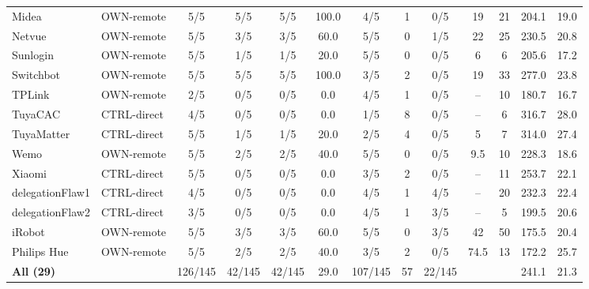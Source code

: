 \begin{table}[t]
\begin{tabular*}{\linewidth}{@{\extracolsep{\fill}} ll ccccc ccc cc @{}}
Midea & OWN-remote & 5/5 & 5/5 & 5/5 & 100.0 & 4/5 & 1 & 0/5 & 19 & 21 & 204.1 & 19.0 \\
Netvue & OWN-remote & 5/5 & 3/5 & 3/5 & 60.0 & 5/5 & 0 & 1/5 & 22 & 25 & 230.5 & 20.8 \\
Sunlogin & OWN-remote & 5/5 & 1/5 & 1/5 & 20.0 & 5/5 & 0 & 0/5 & 6 & 6 & 205.6 & 17.2 \\
Switchbot & OWN-remote & 5/5 & 5/5 & 5/5 & 100.0 & 3/5 & 2 & 0/5 & 19 & 33 & 277.0 & 23.8 \\
TPLink & OWN-remote & 2/5 & 0/5 & 0/5 & 0.0 & 4/5 & 1 & 0/5 & -- & 10 & 180.7 & 16.7 \\
TuyaCAC & CTRL-direct & 4/5 & 0/5 & 0/5 & 0.0 & 1/5 & 8 & 0/5 & -- & 6 & 316.7 & 28.0 \\
TuyaMatter & CTRL-direct & 5/5 & 1/5 & 1/5 & 20.0 & 2/5 & 4 & 0/5 & 5 & 7 & 314.0 & 27.4 \\
Wemo & OWN-remote & 5/5 & 2/5 & 2/5 & 40.0 & 5/5 & 0 & 0/5 & 9.5 & 10 & 228.3 & 18.6 \\
Xiaomi & CTRL-direct & 5/5 & 0/5 & 0/5 & 0.0 & 3/5 & 2 & 0/5 & -- & 11 & 253.7 & 22.1 \\
delegationFlaw1 & CTRL-direct & 4/5 & 0/5 & 0/5 & 0.0 & 4/5 & 1 & 4/5 & -- & 20 & 232.3 & 22.4 \\
delegationFlaw2 & CTRL-direct & 3/5 & 0/5 & 0/5 & 0.0 & 4/5 & 1 & 3/5 & -- & 5 & 199.5 & 20.6 \\
iRobot & OWN-remote & 5/5 & 3/5 & 3/5 & 60.0 & 5/5 & 0 & 3/5 & 42 & 50 & 175.5 & 20.4 \\
Philips Hue & OWN-remote & 5/5 & 2/5 & 2/5 & 40.0 & 3/5 & 2 & 0/5 & 74.5 & 13 & 172.2 & 25.7 \\
\hline
\textbf{All (29)} &  & 126/145 & 42/145 & 42/145 & 29.0 & 107/145 & 57 & 22/145 &  &  & 241.1 & 21.3 \\
\hline\hline
\end{tabular*}
\end{table}
